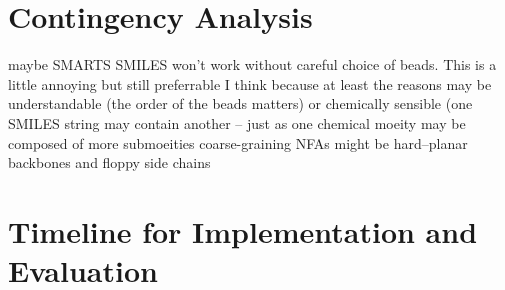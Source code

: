 \section*{Contingency Analysis}

maybe SMARTS SMILES won't work without careful choice of beads. This is a little annoying but still preferrable I think because at least the reasons may be understandable (the order of the beads matters) or chemically sensible (one SMILES string may contain another -- just as one chemical moeity may be composed of more submoeities %
coarse-graining NFAs might be hard--planar backbones and floppy side chains

\section*{Timeline for Implementation and Evaluation}
